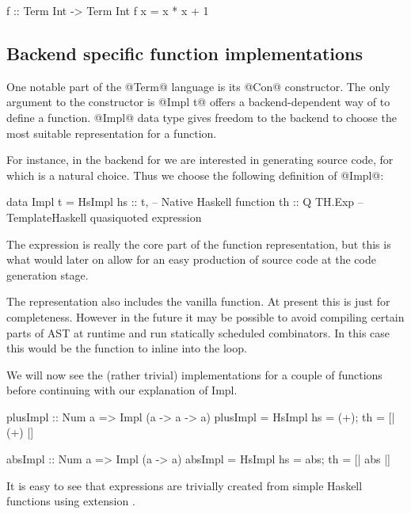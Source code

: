 \documentclass[preamble.tex]{subfiles}
\begin{document}
\begin{hscode}
f :: Term Int -> Term Int
f x = x * x + 1
\end{hscode}



\subsection{Backend specific function implementations}

One notable part of the @Term@ language is its @Con@ constructor. The only argument to the constructor is @Impl t@ offers a backend-dependent way of to define a function. @Impl@ data type gives freedom to the backend to choose the most suitable representation for a function.

For instance, in the \Haskell backend for \LiveFusion we are interested in generating \Haskell source code, for which  \cite{TH} is a natural choice. Thus we choose the following definition of @Impl@:

\begin{hscode}
data Impl t = HsImpl {
                hs :: t,        -- Native Haskell function
                th :: Q TH.Exp  -- TemplateHaskell quasiquoted expression
              } 
\end{hscode}


The  expression is really the core part of the function representation, but this is what would later on allow for an easy production of \Haskell source code at the code generation stage.

The representation also includes the vanilla \Haskell function. At present this is just for completeness. However in the future it may be possible to avoid compiling certain parts of AST at runtime and run statically scheduled combinators. In this case this would be the function to inline into the loop.

We will now see the (rather trivial) implementations for a couple of functions before continuing with our explanation of Impl.

\begin{hscode}
plusImpl :: Num a => Impl (a -> a -> a)
plusImpl = HsImpl { hs = (+); th = [| (+) |] } 

absImpl :: Num a => Impl (a -> a)
absImpl = HsImpl { hs = abs; th = [| abs |] } 
\end{hscode}

It is easy to see that  expressions are trivially created from simple Haskell functions using  extension \cite{QQ}.
\end{document}
